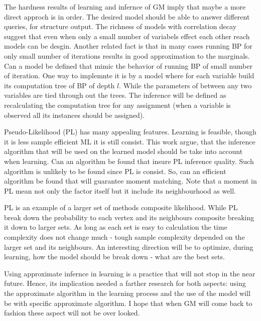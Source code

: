 The hardness results of learning and infernce of GM imply that maybe a more direct approch is in order.
The desired model should be able to answer different queries, for structure output.
The richness of models with correlation decay suggest that even when only a small number of variabels effect  each other reach models can be desgin.
Another related fact is that in many cases running BP for only small number of iterations results in good approximation to the marginals.
Can a model be defined that mimic the behavior of running BP of small number of iteration.
One way to implemnte it is by a model where for each variable build its computation tree of BP of depth $l$.
While the parameters of between any two variables are tied through out the trees.
The inference will be defined as recalculating the computation tree for any assignment (when a variable is observed all its instances should be assigned).


Pseudo-Likelihood (PL) has many appealing features.
Learning is feasible, though it is less sample efficient ML it is still consist.
This work argue, that the inference algorithm that will be used on the learned model should  be take into account when learning.
Can an algorithm be found that insure PL inference quality.
Such algorithm is unlikely to be found since PL is consist.
So, can an efficient algorithm be found that will guarantee moment matching.
Note that a moment in PL mean not only the factor itself but it include its neighbourhood as well.

PL is an example of a larger set of methods composite likelihood.
While PL break down the probability to each vertex and its neighbours composite breaking it down to larger sets.
As long as each set is easy to calculation the time complexity does not change much - tough sample complexity depended on the larger set and its neighbours.
An interesting direction will be to optimize, during learning, how the model should be break down - what are the best sets.

Using approximate infernce in learning is a practice that will not stop in the near future.
Hence, its implication needed a farther research for both aspects: using the approximate algorithm in the learning process and the use of the model will be with specific approximate algorithm.
I hope that when GM will come back to fashion these aspect will not be over looked.

